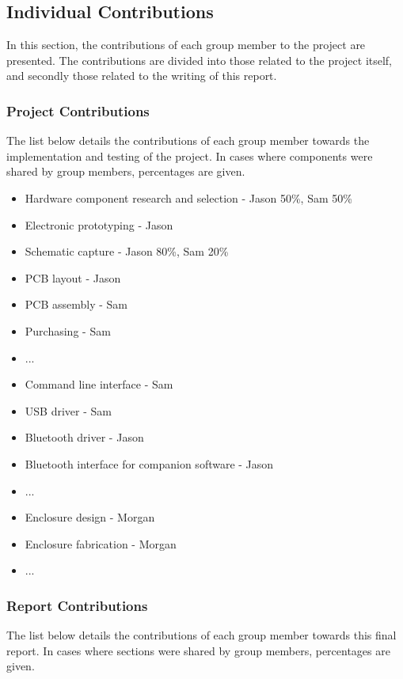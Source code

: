 \subsection{Individual Contributions}
In this section, the contributions of each group member to the project are
presented. The contributions are divided into those related to the project 
itself, and secondly those related to the writing of this report.

\subsubsection{Project Contributions}
The list below details the contributions of each group member towards the
implementation and testing of the project. In cases where components were 
shared by group members, percentages are given.

\begin{itemize}
    \item Hardware component research and selection - Jason 50\%, Sam 50\%
    \item Electronic prototyping - Jason
    \item Schematic capture - Jason 80\%, Sam 20\%
    \item PCB layout - Jason
    \item PCB assembly - Sam
    \item Purchasing - Sam
    \item ...
    \item Command line interface - Sam
    \item USB driver - Sam
    \item Bluetooth driver - Jason
    \item Bluetooth interface for companion software - Jason
    \item ...
    \item Enclosure design - Morgan
    \item Enclosure fabrication - Morgan
    \item ...
\end{itemize}

\subsubsection{Report Contributions}
The list below details the contributions of each group member towards this final
report. In cases where sections were shared by group members, percentages are
given.

